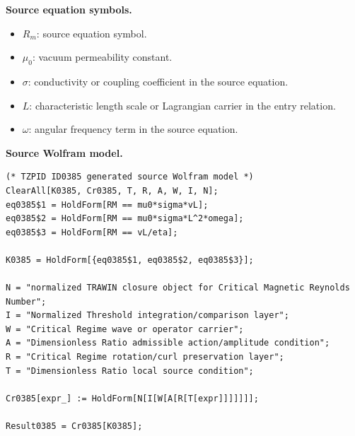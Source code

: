 \begin{minipage}[t]{0.49\linewidth}
\begingroup
\small
\raggedright
\textbf{Source equation symbols.}\par
\begin{itemize}[leftmargin=1.35em,itemsep=1pt,topsep=1pt,parsep=0pt]
    \item $R_m$: source equation symbol.
    \item $\mu_0$: vacuum permeability constant.
    \item $\sigma$: conductivity or coupling coefficient in the source equation.
    \item $L$: characteristic length scale or Lagrangian carrier in the entry relation.
    \item $\omega$: angular frequency term in the source equation.
\end{itemize}
\endgroup
\end{minipage}\hfill
\begin{minipage}[t]{0.47\linewidth}
\begingroup
\scriptsize
\raggedright
\textbf{Source Wolfram model.}\par
\begin{Verbatim}[fontsize=\tiny,breaklines=true,breakanywhere=true]
(* TZPID ID0385 generated source Wolfram model *)
ClearAll[K0385, Cr0385, T, R, A, W, I, N];
eq0385$1 = HoldForm[RM == mu0*sigma*vL];
eq0385$2 = HoldForm[RM == mu0*sigma*L^2*omega];
eq0385$3 = HoldForm[RM == vL/eta];

K0385 = HoldForm[{eq0385$1, eq0385$2, eq0385$3}];

N = "normalized TRAWIN closure object for Critical Magnetic Reynolds Number";
I = "Normalized Threshold integration/comparison layer";
W = "Critical Regime wave or operator carrier";
A = "Dimensionless Ratio admissible action/amplitude condition";
R = "Critical Regime rotation/curl preservation layer";
T = "Dimensionless Ratio local source condition";

Cr0385[expr_] := HoldForm[N[I[W[A[R[T[expr]]]]]]];

Result0385 = Cr0385[K0385];
\end{Verbatim}
\endgroup
\end{minipage}

